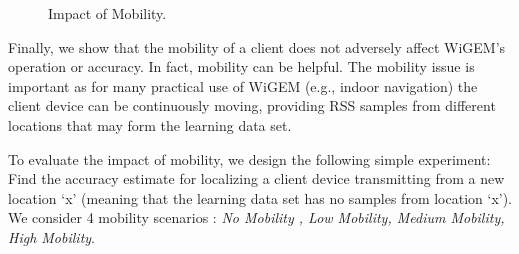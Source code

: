 \begin{figure}[h!]
\centering
  \caption{Impact of Mobility.}
  \label{fig:mobility}
\end{figure}

%

Finally, we show that the mobility of a client 
does not adversely affect WiGEM's operation or accuracy. In fact, mobility can 
be helpful. The mobility issue is important as for many practical use of
WiGEM (e.g., indoor navigation) the client device can be continuously moving,
providing RSS samples from different locations that may form the learning data set. 



To evaluate the impact of mobility, we design the following simple experiment: Find the accuracy estimate for localizing a client device transmitting from a new location `x' (meaning that the learning data set has no samples from location `x'). We consider 4 mobility scenarios : {\it No Mobility , Low Mobility, Medium Mobility, High Mobility}.

